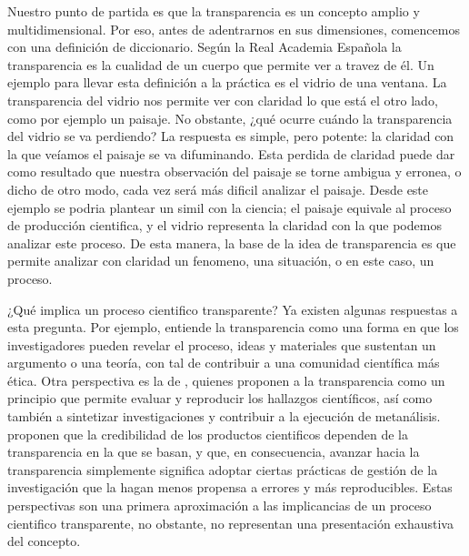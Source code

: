 \documentclass[
]{book}
\begin{document}
Nuestro punto de partida es que la transparencia es un concepto amplio y multidimensional. Por eso, antes de adentrarnos en sus dimensiones, comencemos con una definición de diccionario. Según la Real Academia Española la transparencia es la cualidad de un cuerpo que permite ver a travez de él. Un ejemplo para llevar esta definición a la práctica es el vidrio de una ventana. La transparencia del vidrio nos permite ver con claridad lo que está el otro lado, como por ejemplo un paisaje. No obstante, ¿qué ocurre cuándo la transparencia del vidrio se va perdiendo? La respuesta es simple, pero potente: la claridad con la que veíamos el paisaje se va difuminando. Esta perdida de claridad puede dar como resultado que nuestra observación del paisaje se torne ambigua y erronea, o dicho de otro modo, cada vez será más dificil analizar el paisaje. Desde este ejemplo se podria plantear un simil con la ciencia; el paisaje equivale al proceso de producción cientifica, y el vidrio representa la claridad con la que podemos analizar este proceso. De esta manera, la base de la idea de transparencia es que permite analizar con claridad un fenomeno, una situación, o en este caso, un proceso.

¿Qué implica un proceso cientifico transparente? Ya existen algunas respuestas a esta pregunta. Por ejemplo, \citet{breznau_Does_2021} entiende la transparencia como una forma en que los investigadores pueden revelar el proceso, ideas y materiales que sustentan un argumento o una teoría, con tal de contribuir a una comunidad científica más ética. Otra perspectiva es la de \citet{aczel_consensusbased_2020}, quienes proponen a la transparencia como un principio que permite evaluar y reproducir los hallazgos científicos, así como también a sintetizar investigaciones y contribuir a la ejecución de metanálisis. \citet{klein_Practical_2018} proponen que la credibilidad de los productos cientificos dependen de la transparencia en la que se basan, y que, en consecuencia, avanzar hacia la transparencia simplemente significa adoptar ciertas prácticas de gestión de la investigación que la hagan menos propensa a errores y más reproducibles. Estas perspectivas son una primera aproximación a las implicancias de un proceso cientifico transparente, no obstante, no representan una presentación exhaustiva del concepto.
\end{document}
